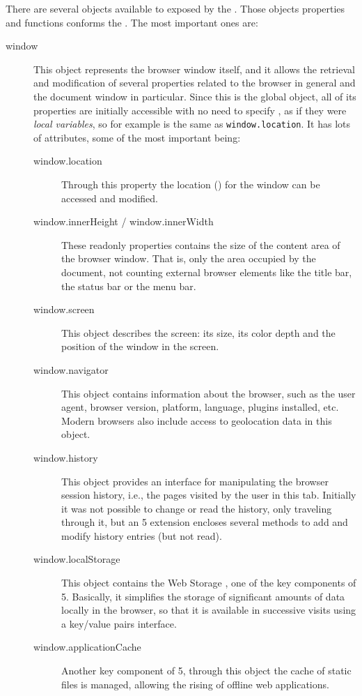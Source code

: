 There are several objects available to  exposed by the .
Those objects properties and functions conforms the .
The most important ones are:

\begin{description}
  \item[window] This object represents the browser window itself, and it allows the retrieval and modification of several properties related to the browser in general and the document window in particular.
  Since this is the global object, all of its properties are initially accessible with no need to specify , as if they were \emph{local variables}, so for example  is the same as \texttt{window.location}.
  It has lots of attributes, some of the most important being:
  \begin{description}
    \item[window.location] Through this property the location () for the window can be accessed and modified.
    \item[window.innerHeight / window.innerWidth] These readonly properties contains the size of the content area of the browser window. That is, only the area occupied by the document, not counting external browser elements like the title bar, the status bar or the menu bar.
    \item[window.screen] This object describes the screen: its size, its color depth and the position of the window in the screen.
    \item[window.navigator] This object contains information about the browser, such as the user agent, browser version, platform, language, plugins installed, etc.
    Modern browsers also include access to geolocation data in this object.
    \item[window.history] This object provides an interface for manipulating the browser session history, i.e., the pages visited by the user in this tab.
    Initially it was not possible to change or read the history, only traveling through it, but an 5 extension encloses several methods to add and modify history entries (but not read).
    \item[window.localStorage] This object contains the Web Storage , one of the key components of 5.
    Basically, it simplifies the storage of significant amounts of data locally in the browser, so that it is available in successive visits using a key/value pairs interface.
    \item[window.applicationCache] Another key component of 5, through this object the cache of static files is managed, allowing the rising of offline web applications.

\end{description}
\end{description}
